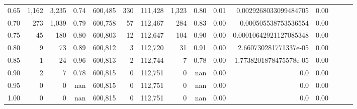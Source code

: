 \begin{tabular}{rrrrrrrrrrrrrrr}
0.65 &    1,162 &   3,235 &  0.74 &  600,485 &      330 &  111,428 &    1,323 &  0.80 &  0.01 &   0.0029268033099484705 &      0.00 \\
0.70 &      273 &   1,039 &  0.79 &  600,758 &       57 &  112,467 &      284 &  0.83 &  0.00 &    0.000505538753536554 &      0.00 \\
0.75 &       45 &     180 &  0.80 &  600,803 &       12 &  112,647 &      104 &  0.90 &  0.00 &  0.00010642921127085348 &      0.00 \\
0.80 &        9 &      73 &  0.89 &  600,812 &        3 &  112,720 &       31 &  0.91 &  0.00 &   2.660730281771337e-05 &      0.00 \\
0.85 &        1 &      24 &  0.96 &  600,813 &        2 &  112,744 &        7 &  0.78 &  0.00 &  1.7738201878475578e-05 &      0.00 \\
0.90 &        2 &       7 &  0.78 &  600,815 &        0 &  112,751 &        0 &   nan &  0.00 &                     0.0 &      0.00 \\
0.95 &        0 &       0 &   nan &  600,815 &        0 &  112,751 &        0 &   nan &  0.00 &                     0.0 &      0.00 \\
1.00 &        0 &       0 &   nan &  600,815 &        0 &  112,751 &        0 &   nan &  0.00 &                     0.0 &      0.00 \\
\bottomrule
\end{tabular}
